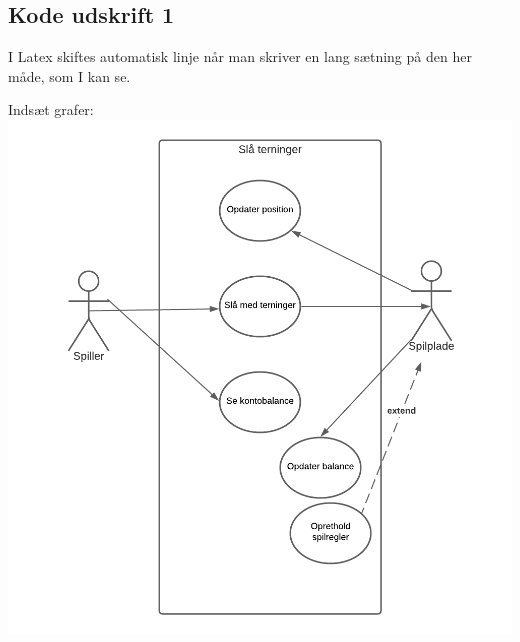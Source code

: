 \begin{flushleft} %

\subsection{Kode udskrift 1}

I Latex skiftes automatisk linje når man skriver en lang sætning på den her måde, som I kan se.

\addlinespace %

Indsæt grafer:
\includegraphics[width=1\textwidth]{Report/figures/Use case diagram CDIO del3.png}~\\[1cm]


\end{flushleft}